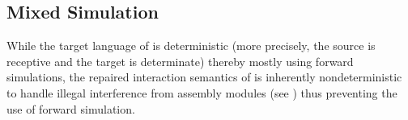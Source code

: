 \subsection{Mixed Simulation}
\label{sec:overview-verification:mixedsim}

While the target language of \cc{} is deterministic (more precisely,
the source is receptive and the target is determinate) thereby mostly
using forward simulations, the repaired interaction semantics of
\ccm{} is inherently nondeterministic to handle illegal interference from assembly modules
(see ) thus preventing the
use of forward simulation.


